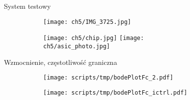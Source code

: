 \begin{frame}{System testowy}

    \begin{figure}[H]
        \centering
        \begin{subfigure}[b]{0.65\textwidth}
            \centering
            \texttt{[image: ch5/IMG\_3725.jpg]}
        \end{subfigure}
        \hfill
        \begin{subfigure}[b]{0.3\textwidth}
            \centering
            \texttt{[image: ch5/chip.jpg]} 
            \texttt{[image: ch5/asic\_photo.jpg]}
        \end{subfigure}     

   \end{figure}
\end{frame}


\begin{frame}{Wzmocnienie, częstotliwość graniczna}

    \begin{figure}[H]
        \centering
        \begin{subfigure}[b]{0.485\textwidth}
            \centering
            \texttt{[image: scripts/tmp/bodePlotFc\_2.pdf]}  

        \end{subfigure}
        \begin{subfigure}[b]{0.485\textwidth}
            \centering
            \texttt{[image: scripts/tmp/bodePlotFc\_ictrl.pdf]}

        \end{subfigure}     

    \end{figure}


\end{frame}

%  




